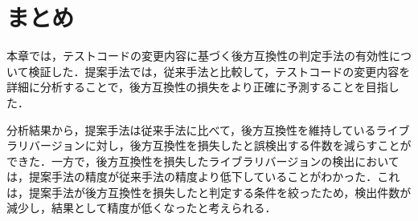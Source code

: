 \documentclass[11pt,dvipdfmx]{jreport}
\begin{document}




\section{まとめ}
本章では，テストコードの変更内容に基づく後方互換性の判定手法の有効性について検証した．提案手法では，従来手法と比較して，テストコードの変更内容を詳細に分析することで，後方互換性の損失をより正確に予測することを目指した．

分析結果から，提案手法は従来手法に比べて，後方互換性を維持しているライブラリバージョンに対し，後方互換性を損失したと誤検出する件数を減らすことができた．一方で，後方互換性を損失したライブラリバージョンの検出においては，提案手法の精度が従来手法の精度より低下していることがわかった．これは，提案手法が後方互換性を損失したと判定する条件を絞ったため，検出件数が減少し，結果として精度が低くなったと考えられる．
\end{document}
